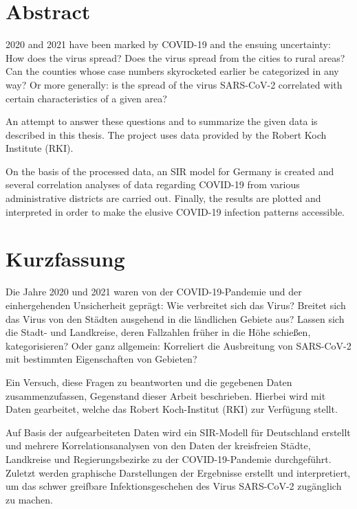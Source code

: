 \chapter*{Abstract}
2020 and 2021 have been marked by COVID-19 and the ensuing uncertainty:
How does the virus spread? Does the virus spread from the cities to rural areas? Can the counties whose case numbers skyrocketed earlier be categorized in any way? Or more generally: is the spread of the virus SARS-CoV-2 correlated with certain characteristics of a given area?

An attempt to answer these questions and to summarize the given data is described in this thesis. The project uses data provided by the Robert Koch Institute (RKI).

On the basis of the processed data, an SIR model for Germany is created and several correlation analyses of data regarding COVID-19 from various administrative districts are carried out.
Finally, the results are plotted and interpreted in order to make the elusive COVID-19 infection patterns accessible.

\chapter*{Kurzfassung}
Die Jahre 2020 und 2021 waren von der COVID-19-Pandemie und der einhergehenden Unsicherheit geprägt:
Wie verbreitet sich das Virus? Breitet sich das Virus von den Städten ausgehend in die ländlichen Gebiete aus? Lassen sich die Stadt- und Landkreise, deren Fallzahlen früher in die Höhe schießen, kategorisieren? Oder ganz allgemein: Korreliert die Ausbreitung von SARS-CoV-2 mit bestimmten Eigenschaften von Gebieten?

Ein Versuch, diese Fragen zu beantworten und die gegebenen Daten zusammenzufassen, Gegenstand dieser Arbeit beschrieben. Hierbei wird mit Daten gearbeitet, welche das Robert Koch-Institut (RKI) zur Verfügung stellt.

Auf Basis der aufgearbeiteten Daten wird ein SIR-Modell für Deutschland erstellt und mehrere Korrelationsanalysen von den Daten der kreisfreien Städte, Landkreise und Regierungsbezirke zu der COVID-19-Pandemie durchgeführt.
Zuletzt werden graphische Darstellungen der Ergebnisse erstellt und interpretiert, um das schwer greifbare Infektionsgeschehen des Virus SARS-CoV-2 zugänglich zu machen.
\newpage